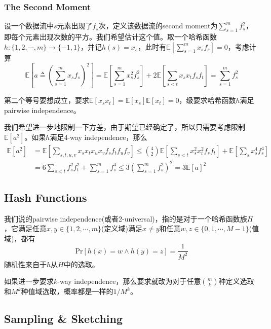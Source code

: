 \documentclass[8pt]{article}
\theoremstyle{compact}
\def\le{\leqslant}
\def\Pr#1{\text{Pr}\left[{#1}\right]}
\def\E#1{\mathbb{E}\left[{#1}\right]}
\begin{document}
\subsubsection{The Second Moment}

设一个数据流中$s$元素出现了$f_s$次，定义该数据流的second moment为$\sum\limits_{s=1}^{m}f_s^2$，即每个元素出现次数的平方。我们希望估计这个值。取一个哈希函数$h: \{1, 2, \cdots, m\} \to \{-1, 1\}$，并记$h(s) = x_s$，此时有$\E{\sum\limits_{s=1}^{m}x_sf_s} = 0$，考虑计算
\begin{equation}
	\E{a \triangleq \left(\sum_{s=1}^{m}x_sf_s\right)^2} = \E{\sum_{s=1}^{m}x_s^2f_s^2} + 2\E{\sum_{s < t}x_sx_tf_sf_t} = \sum_{s=1}^{m}f_s^2
\end{equation}

第二个等号要想成立，要求$\E{x_sx_t} = \E{x_s}\E{x_t} = 0$，级要求哈希函数$h$满足pairwise independence。

我们希望进一步地限制一下方差，由于期望已经确定了，所以只需要考虑限制$\E{a^2}$。如果$h$满足4-way independence，那么
\begin{equation}
\begin{split}
\E{a^2} &= \E{\sum_{s, t, u, v}x_sx_tx_ux_vf_sf_tf_uf_v} \le \binom{4}{2}\E{\sum_{s < t}x_s^2x_t^2f_sf_t} + \E{\sum_s x_s^4f_s^4}\\
&=6\sum_{s < t}f_s^2f_t^2 + \sum_{s=1}^{m}f_s^4 \le 3\left( \sum_{s=1}^{m}f_s^2 \right)^2 = 3\E{a}^2
\end{split}
\end{equation}


\subsection{Hash Functions}

我们说的pairwise independence(或者2-universal)，指的是对于一个哈希函数族$H$，它满足任意$x, y \in \{1, 2, \cdots, m\}$(定义域)满足$x \neq y$和任意$w, z \in \{0, 1, \cdots, M-1\}$(值域)，都有\begin{equation}
\Pr{h(x) = w \wedge h(y) = z} = \frac{1}{M^2}
\end{equation}
随机性来自于$h$从$H$中的选取。

如果进一步要求$k$-way independence，那么要求就改为对于任意$\binom{m}{k}$种定义选取和$M^k$种值域选取，概率都是一样的$1 / M^k$。

\subsection{Sampling \& Sketching}
\end{document}
